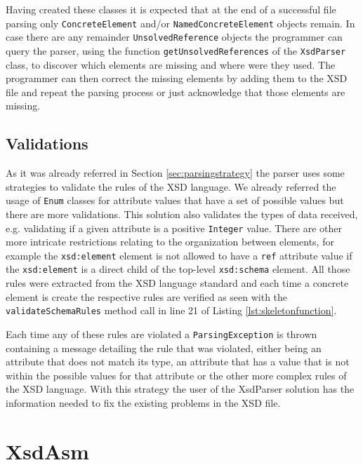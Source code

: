 \noindent
Having created these classes it is expected that at the end of a successful file parsing only \texttt{ConcreteElement} and/or \texttt{NamedConcreteElement} objects remain. In case there are any remainder \texttt{UnsolvedReference} objects the programmer can query the parser, using the function \texttt{getUnsolvedReferences} of the \texttt{XsdParser} class, to discover which elements are missing and where were they used. The programmer can then correct the missing elements by adding them to the \ac{XSD} file and repeat the parsing process or just acknowledge that those elements are missing. 

\subsection{Validations}

As it was already referred in Section \ref{sec:parsingstrategy} the parser uses some strategies to validate the rules of the \ac{XSD} language. We already referred the usage of \texttt{Enum} classes for attribute values that have a set of possible values but there are more validations. This solution also validates the types of data received, e.g. validating if a given attribute is a positive \texttt{Integer} value. There are other more intricate restrictions relating to the organization between elements, for example the \texttt{xsd:element} element is not allowed to have a \texttt{ref} attribute value if the \texttt{xsd:element} is a direct child of the top-level \texttt{xsd:schema} element. All those rules were extracted from the \ac{XSD} language standard and each time a concrete element is create the respective rules are verified as seen with the \texttt{validateSchemaRules} method call in line 21 of Listing \ref{lst:skeletonfunction}. 

\noindent
Each time any of these rules are violated a \texttt{ParsingException} is thrown containing a message detailing the rule that was violated, either being an attribute that does not match its type, an attribute that has a value that is not within the possible values for that attribute or the other more complex rules of the \ac{XSD} language. With this strategy the user of the XsdParser solution has the information needed to fix the existing problems in the \ac{XSD} file.

\section{XsdAsm} %
\label{sec:xsdasm}

